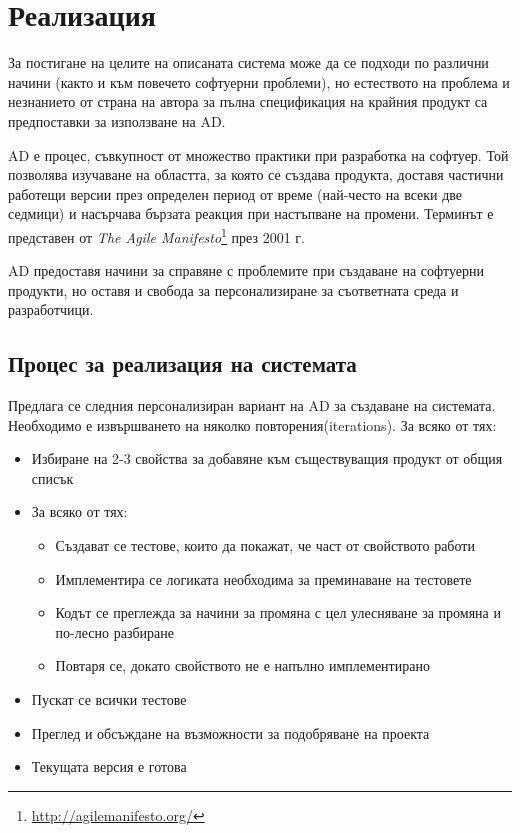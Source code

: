 \section{Реализация}
	
	За постигане на целите на описаната система може да се подходи по различни начини (както и към повечето софтуерни проблеми), но естеството на проблема и незнанието от страна на автора за пълна спецификация на крайния продукт са предпоставки за използване на \ac{AD}.
	
	\ac{AD} е процес, съвкупност от множество практики при разработка на софтуер. Той позволява изучаване на областта, за която се създава продукта, доставя частични работещи версии през определен период от време (най-често на всеки две седмици) и насърчава бързата реакция при настъпване на промени. Терминът е представен от \emph{The Agile Manifesto}\footnote{\url{http://agilemanifesto.org/}} през 2001 г.
	
	\ac{AD} предоставя начини за справяне с проблемите при създаване на софтуерни продукти, но оставя и свобода за персонализиране за съответната среда и разработчици.
	
	\subsection{Процес за реализация на системата}
	
		Предлага се следния персонализиран вариант на \ac{AD} за създаване на системата. Необходимо е извършването на няколко повторения(iterations). За всяко от тях:
	
		\begin{itemize}
			\item Избиране на 2-3 свойства за добавяне към съществуващия продукт от общия списък
			\item За всяко от тях:
				\begin{itemize}
					\item Създават се тестове, които да покажат, че част от свойството работи
					\item Имплементира се логиката необходима за преминаване на тестовете
					\item Кодът се преглежда за начини за промяна с цел улесняване за промяна и по-лесно разбиране
					\item Повтаря се, докато свойството не е напълно имплементирано
				\end{itemize}
			\item Пускат се всички тестове
			\item Преглед и обсъждане на възможности за подобряване на проекта
			\item Текущата версия е готова
		\end{itemize}
		
